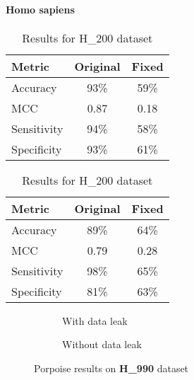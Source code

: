       \paragraph{Homo sapiens}
      \noindent
      \begin{table}[H]
        \centering
        \begin{minipage}{0.45\textwidth}
          \centering
          \begin{tabular}{lcc}
            \toprule
            \textbf{Metric} & \textbf{Original} & \textbf{Fixed} \\
            \midrule
            Accuracy        & 93\%              & 59\%           \\
            MCC             & 0.87              & 0.18           \\
            Sensitivity     & 94\%              & 58\%           \\
            Specificity     & 93\%              & 61\%           \\
            \bottomrule
          \end{tabular}
          \caption{Results for H\_990 dataset}
        \end{minipage}%
        \hfill
        \begin{minipage}{0.45\textwidth}
          \centering
          \begin{tabular}{lcc}
            \toprule
            \textbf{Metric} & \textbf{Original} & \textbf{Fixed} \\
            \midrule
            Accuracy        & 89\%              & 64\%           \\
            MCC             & 0.79              & 0.28           \\
            Sensitivity     & 98\%              & 65\%           \\
            Specificity     & 81\%              & 63\%           \\
            \bottomrule
          \end{tabular}
          \caption{Results for H\_200 dataset}
        \end{minipage}\label{tab:pseust_pstnpss_hs}
      \end{table}

      \begin{figure}[H]
        \centering
        \begin{subfigure}{0.47\textwidth}
          \centering
          \resizebox{\textwidth}{!}{}
          \captionsetup{justification=centering}
          \caption{With data leak}
        \end{subfigure}%
        \hspace{0.05\textwidth}
        \begin{subfigure}{0.47\textwidth}
          \centering
          \resizebox{\textwidth}{!}{}
          \captionsetup{justification=centering}
          \caption{Without data leak}
        \end{subfigure}
        \caption{Porpoise results on \textbf{H\_990} dataset}\label{fig:pseu-st_h990}
      \end{figure}

